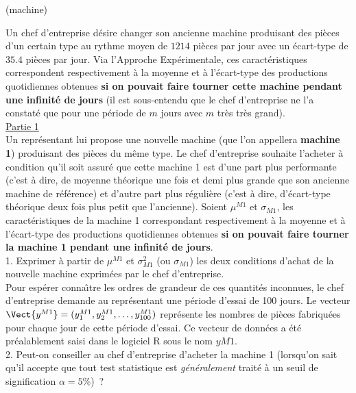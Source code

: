 \documentclass[10pt]{report}
\begin{document}
\begin{exercice} (machine)

Un chef d'entreprise d{\'e}sire changer son ancienne machine produisant des pi{\`e}ces d'un certain type au rythme moyen de $1214$ pi{\`e}ces par jour avec un {\'e}cart-type de $35.4$ pi{\`e}ces par jour. Via l'Approche Exp{\'e}rimentale, ces caract{\'e}ristiques correspondent respectivement {\`a} la moyenne et {\`a} l'{\'e}cart-type des productions quotidiennes obtenues \textbf{si on pouvait faire tourner cette machine pendant une infinit{\'e} de jours} (il est sous-entendu que le chef d'entreprise ne l'a constat{\'e} que pour une p{\'e}riode de $m$ jours avec $m$ tr{\`e}s tr{\`e}s grand).\\

\noindent \underline{Partie 1} \\

Un repr{\'e}sentant lui propose une nouvelle machine (que l'on appellera \textbf{machine 1}) produisant des pi{\`e}ces du m{\^e}me type. Le chef d'entreprise souhaite l'acheter {\`a} condition qu'il soit assur{\'e} que cette machine 1 est d'une part plus performante (c'est {\`a} dire, de moyenne th{\'e}orique une fois et demi plus grande que son ancienne machine de r{\'e}f{\'e}rence) et d'autre part plus r{\'e}guli{\`e}re (c'est {\`a} dire, d'{\'e}cart-type th{\'e}orique deux fois plus petit que l'ancienne). Soient $\mu^{M1}$ et $\sigma_{M1}$, les caract{\'e}ristiques de la machine 1 correspondant respectivement {\`a} la moyenne et {\`a} l'{\'e}cart-type des productions quotidiennes obtenues \textbf{si on pouvait faire tourner la machine 1 pendant une infinit{\'e} de jours}.\\

1. Exprimer {\`a} partir de $\mu^{M1}$ et $\sigma^2_{M1}$ (ou $\sigma_{M1}$) les deux conditions d'achat de la nouvelle machine exprim{\'e}es par le chef d'entreprise.\\



Pour esp{\'e}rer conna{\^\i}tre les ordres de grandeur de ces quantit{\'e}s inconnues, le chef d'entreprise demande au repr{\'e}sentant une p{\'e}riode d'essai de 100 jours. Le vecteur $\Vect{y^{M1}}=(y_1^{M1},y_2^{M1},\ldots,y_{100}^{M1})$ repr{\'e}sente les nombres de pi{\`e}ces fabriqu{\'e}es pour chaque jour de cette p{\'e}riode d'essai. Ce vecteur de donn{\'e}es a {\'e}t{\'e} pr{\'e}alablement saisi dans le logiciel R sous le nom $yM1$. \\

2. Peut-on conseiller au chef d'entreprise d'acheter la machine 1 (lorsqu'on sait qu'il accepte que tout test statistique est \textit{g{\'e}n{\'e}ralement} trait{\'e} {\`a} un seuil de signification $\alpha=5\%$)~? \\


\end{exercice}
\end{document}
